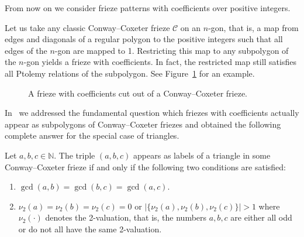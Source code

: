 \documentclass[ALCO,ThmDefs,Unicode,epreuves,published]{cedram}
\numberwithin{equation}{section}
\begin{document}
From now on we consider frieze patterns with coefficients over positive integers. 

Let us take any classic Conway--Coxeter 
frieze $\mathcal{C}$ on an $n$-gon, that is, a map
from edges and diagonals of a regular
polygon to the positive integers such that all edges of the $n$-gon are mapped to 1.
Restricting this map to any subpolygon of the
$n$-gon yields a frieze with coefficients. In fact,
the restricted
map still satisfies all Ptolemy relations of the subpolygon. See Figure~\ref{fig:cut}
for an example. 

\begin{figure}[htb]\centering
\mbox{\hskip2cm}
 \caption{A frieze with coefficients cut out of a Conway--Coxeter frieze. 
 \label{fig:cut}}
\end{figure}


In~\cite{CHJ} we addressed the fundamental question which friezes with coefficients 
actually appear as subpolygons of Conway--Coxeter friezes and obtained the 
following complete answer for the special case of triangles.


\begin{theo} \label{thm:triangle}
Let $a,b,c\in \mathbb{N}$. The triple $(a,b,c)$ appears as labels of a triangle
in some Conway--Coxeter frieze if and only if the following two conditions are
satisfied:
\begin{enumerate}
\item $\gcd(a,b)=\gcd(b,c)=\gcd(a,c)$.
\item $\nu_2(a)=\nu_2(b)=\nu_2(c)=0$ or $|\{\nu_2(a),\nu_2(b),\nu_2(c)\}|>1$ where
$\nu_2(\cdot )$ denotes the 2-valuation, that is, the numbers $a,b,c$ are either all odd or 
do not all have the same 2-valuation.
\end{enumerate}
\end{theo}
\end{document}
